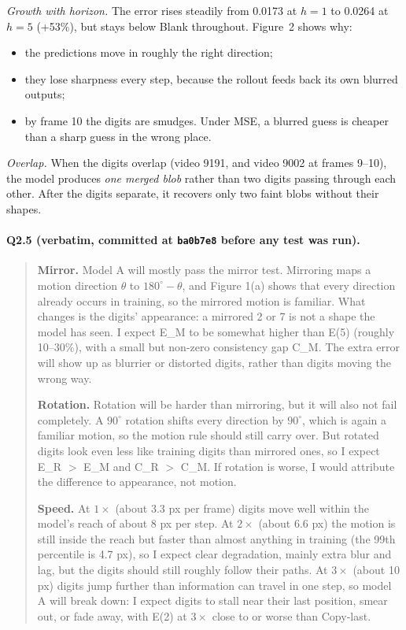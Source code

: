 \documentclass[11pt,a4paper]{article}
\begin{document}
\emph{Growth with horizon.} The error rises steadily from 0.0173 at $h=1$ to
0.0264 at $h=5$ (+53\%), but stays below Blank throughout. Figure~2 shows why:
\begin{itemize}
  \item the predictions move in roughly the right direction;
  \item they lose sharpness every step, because the rollout feeds back its own
        blurred outputs;
  \item by frame 10 the digits are smudges. Under MSE, a blurred guess is
        cheaper than a sharp guess in the wrong place.
\end{itemize}
\emph{Overlap.} When the digits overlap (video 9191, and video 9002 at frames
9--10), the model produces \emph{one merged blob} rather than two digits
passing through each other. After the digits separate, it recovers only two
faint blobs without their shapes.

\paragraph{Q2.5 (verbatim, committed at \texttt{ba0b7e8} before any test was run).}
\begin{quote}\small
\textbf{Mirror.} Model A will mostly pass the mirror test. Mirroring maps a motion direction $\theta$ to $180^\circ-\theta$, and Figure 1(a) shows that every direction already occurs in training, so the mirrored motion is familiar. What changes is the digits' appearance: a mirrored 2 or 7 is not a shape the model has seen. I expect E\_M to be somewhat higher than E(5) (roughly 10--30\%), with a small but non-zero consistency gap C\_M. The extra error will show up as blurrier or distorted digits, rather than digits moving the wrong way.

\textbf{Rotation.} Rotation will be harder than mirroring, but it will also not fail completely. A $90^\circ$ rotation shifts every direction by $90^\circ$, which is again a familiar motion, so the motion rule should still carry over. But rotated digits look even less like training digits than mirrored ones, so I expect E\_R $>$ E\_M and C\_R $>$ C\_M. If rotation is worse, I would attribute the difference to appearance, not motion.

\textbf{Speed.} At $1\times$ (about 3.3 px per frame) digits move well within the model's reach of about 8 px per step. At $2\times$ (about 6.6 px) the motion is still inside the reach but faster than almost anything in training (the 99th percentile is 4.7 px), so I expect clear degradation, mainly extra blur and lag, but the digits should still roughly follow their paths. At $3\times$ (about 10 px) digits jump further than information can travel in one step, so model A will break down: I expect digits to stall near their last position, smear out, or fade away, with E(2) at $3\times$ close to or worse than Copy-last.
\end{quote}
\end{document}
